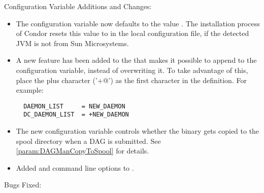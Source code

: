 \noindent Configuration Variable Additions and Changes:

\begin{itemize}

\item The configuration variable  now
defaults to the value .  The installation process of
Condor resets this value to  in the local
configuration file, if the detected JVM is not from Sun Microsystems.

\item A new feature has been added to the  that makes
it possible to append to the  configuration
variable, instead of overwriting it.  To take advantage of this, place
the plus character ('\verb@+@') as the first character in the
 definition.  For example:
\begin{verbatim}
  DAEMON_LIST     = NEW_DAEMON
  DC_DAEMON_LIST  = +NEW_DAEMON
\end{verbatim}

\item The new configuration variable 
controls whether the  binary gets copied to the spool
directory when a DAG is submitted.  See \ref{param:DAGManCopyToSpool}
for details.

\item Added  and  command line options to
.

\end{itemize}

\noindent Bugs Fixed:

